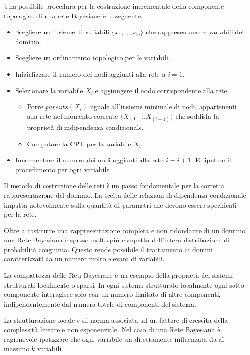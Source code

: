 Una possibile procedura per la costruzione incrementale della componente topologica
di una rete Bayesiane è la seguente:
\begin{itemize}
    \item Scegliere un insieme di variabili $\{x_1, \dots, x_n\}$ che rappresentano
          le variabili del dominio.
    \item Scegliere un ordinamento topologico per le variabili.
    \item Inizializzare il numero dei nodi aggiunti alla rete a $i = 1$.
    \item Selezionare la variabile $X_i$ e aggiungere il nodo corrispondente alla
          rete.
          \begin{itemize}
              \item Porre $parents(X_i)$ uguale all'insieme minimale di nodi,
                    appartenenti alla rete nel momento corrente $\{X_{(1)} \dots X_{(i-1)}\}$
                    che soddisfa la proprietà di indipendenza condizionale.
              \item Computare la CPT per la variabile $X_i$.
          \end{itemize}
    \item Incrementare il numero dei nodi aggiunti alla rete $i=i+1$. E ripetere il
          procedimento per ogni variabile.
\end{itemize}
Il metodo di costruzione delle reti è un passo fondamentale per la corretta
rappresentazione del dominio. La scelta delle relazioni di dipendenza condizionale
impatta notevolmente sulla quantità di parametri che devono essere specificati
per la rete.

Oltre a costituire una rappresentazione completa e non ridondante di un dominio
una Rete Bayesiana è spesso molto più compatta dell'intera distribuzione di
probabilità congiunta. Questo rende possibile il trattamento di domini
caratterizzati da un numero molto elevato di variabili.

La compattezza delle Reti Bayesiane è un esempio della proprietà dei sistemi
strutturati localmente o sparsi. In ogni sistema strutturato localmente ogni
sotto-componente interagisce solo con un numero limitato di altre componenti,
indipendentemente dal numero totale di componenti del sistema.

La strutturazione locale è di norma associata ad un fattore di crescita della
complessità lineare e non esponenziale. Nel caso di una Rete Bayesiana è
ragionevole ipotizzare che ogni variabile sia direttamente influenzata da al
massimo $k$ variabili.

